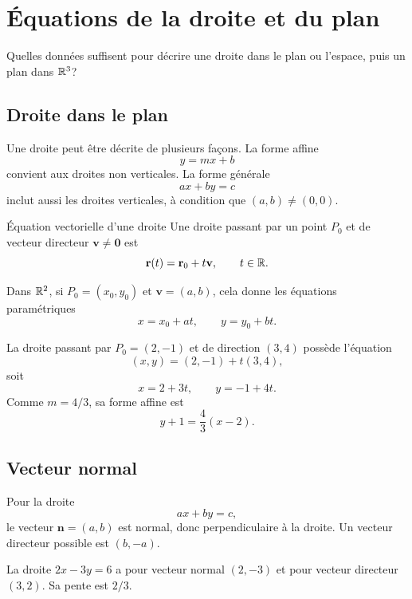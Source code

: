 \chapter{Équations de la droite et du plan}
\label{manual:chapter:10}

\begin{questionbox}
Quelles données suffisent pour décrire une droite dans le plan ou l'espace, puis un plan dans $\mathbb{R}^3$?
\end{questionbox}

\section{Droite dans le plan}
\label{manual:section:10.01}

Une droite peut être décrite de plusieurs façons. La forme affine
\[
y=mx+b
\]
convient aux droites non verticales. La forme générale
\[
ax+by=c
\]
inclut aussi les droites verticales, à condition que \((a,b)\ne(0,0)\).

\begin{definition}{Équation vectorielle d'une droite}{}
Une droite passant par un point $P_0$ et de vecteur directeur $\mathbf v\neq\mathbf0$ est
\[
\mathbf r(t)=\mathbf r_0+t\mathbf v,
\qquad t\in\mathbb{R}.
\]
\end{definition}

Dans $\mathbb{R}^2$, si $P_0=(x_0,y_0)$ et $\mathbf v=(a,b)$, cela donne les équations paramétriques
\[
x=x_0+at,
\qquad
y=y_0+bt.
\]

\begin{examplebox}
La droite passant par $P_0=(2,-1)$ et de direction $(3,4)$ possède l'équation
\[
(x,y)=(2,-1)+t(3,4),
\]
soit
\[
x=2+3t,
\qquad y=-1+4t.
\]
Comme $m=4/3$, sa forme affine est
\[
y+1=\frac43(x-2).
\]
\end{examplebox}

\section{Vecteur normal}
\label{manual:section:10.02}

Pour la droite
\[
ax+by=c,
\]
le vecteur $\mathbf n=(a,b)$ est normal, donc perpendiculaire à la droite. Un vecteur directeur possible est $(b,-a)$.

\begin{examplebox}
La droite $2x-3y=6$ a pour vecteur normal $(2,-3)$ et pour vecteur directeur $(3,2)$. Sa pente est $2/3$.
\end{examplebox}

